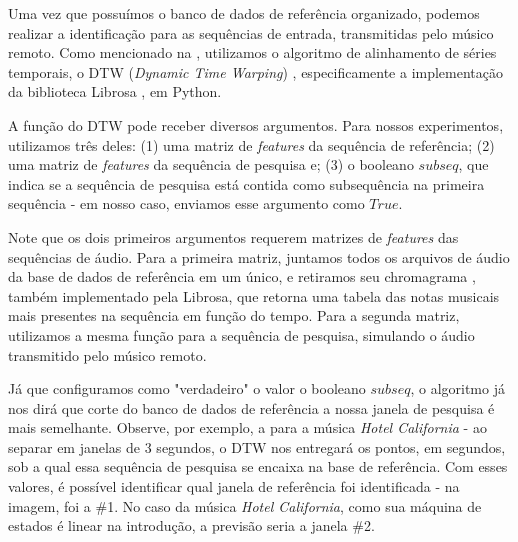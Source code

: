 Uma vez que possuímos o banco de dados de referência organizado, podemos realizar a identificação para as sequências de entrada, transmitidas pelo músico remoto. Como mencionado na , utilizamos o algoritmo de alinhamento de séries temporais, o DTW (\textit{Dynamic Time Warping}) \cite{dtw}, especificamente a implementação da biblioteca Librosa \cite{librosa}, em Python.

A função do DTW pode receber diversos argumentos. Para nossos experimentos, utilizamos três deles: (1) uma matriz de \textit{features} da sequência de referência; (2) uma matriz de \textit{features} da sequência de pesquisa e; (3) o booleano $subseq$, que indica se a sequência de pesquisa está contida como subsequência na primeira sequência - em nosso caso, enviamos esse argumento como $True$.

Note que os dois primeiros argumentos requerem matrizes de \textit{features} das sequências de áudio. Para a primeira matriz, juntamos todos os arquivos de áudio da base de dados de referência em um único, e retiramos seu chromagrama \cite{chromagram}, também implementado pela Librosa, que retorna uma tabela das notas musicais mais presentes na sequência em função do tempo. Para a segunda matriz, utilizamos a mesma função para a sequência de pesquisa, simulando o áudio transmitido pelo músico remoto.

Já que configuramos como "verdadeiro" o valor o booleano $subseq$, o algoritmo já nos dirá que corte do banco de dados de referência a nossa janela de pesquisa é mais semelhante. Observe, por exemplo, a  para a música \textit{Hotel California} - ao separar em janelas de 3 segundos, o DTW nos entregará os pontos, em segundos, sob a qual essa sequência de pesquisa se encaixa na base de referência. Com esses valores, é possível identificar qual janela de referência foi identificada - na imagem, foi a \#1. No caso da música \textit{Hotel California}, como sua máquina de estados é linear na introdução, a previsão seria a janela \#2.

